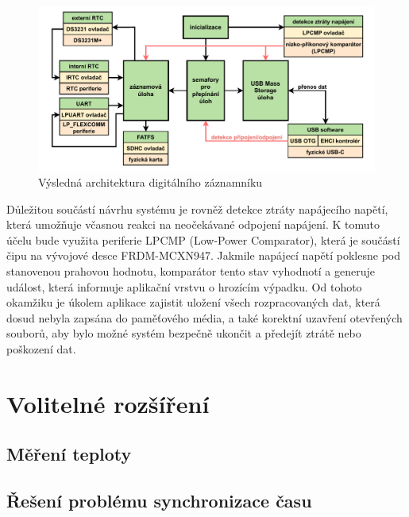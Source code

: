 \begin{figure}[h]
    \centering
    \includegraphics[width=1.00\textwidth]{obrazky-figures/system_architecture.pdf}
    
    \caption{Výsledná architektura digitálního záznamníku}
    \label{fig:system-architecture}
\end{figure}

Důležitou součástí návrhu systému je rovněž detekce ztráty napájecího napětí, která umožňuje včasnou reakci na neočekávané odpojení napájení. K tomuto účelu bude využita periferie LPCMP (Low-Power Comparator), která je součástí čipu na vývojové desce FRDM-MCXN947. Jakmile napájecí napětí poklesne pod stanovenou prahovou hodnotu, komparátor tento stav vyhodnotí a generuje událost, která informuje aplikační vrstvu o hrozícím výpadku. Od tohoto okamžiku je úkolem aplikace zajistit uložení všech rozpracovaných dat, která dosud nebyla zapsána do paměťového média, a také korektní uzavření otevřených souborů, aby bylo možné systém bezpečně ukončit a předejít ztrátě nebo poškození dat.



\section{Volitelné rozšíření}
\subsection{Měření teploty}


\subsection{Řešení problému synchronizace času}


